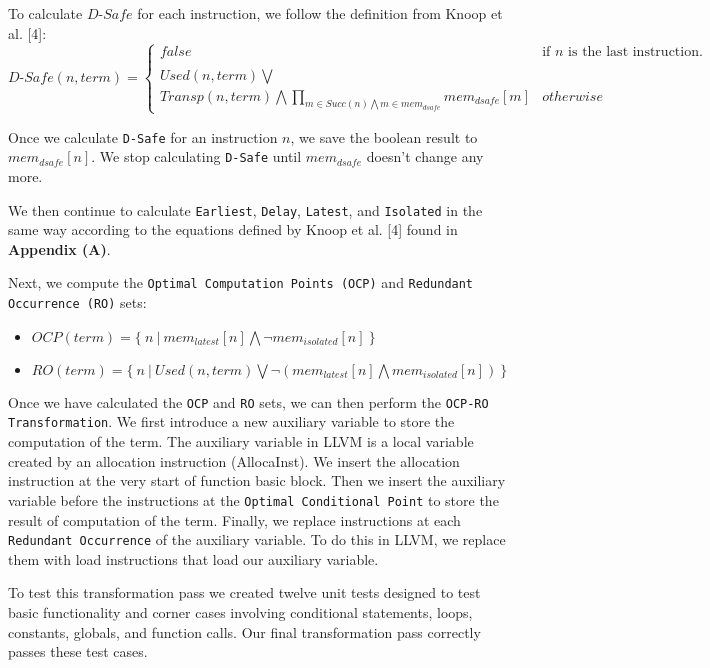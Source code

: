 \documentclass[onecolumn,10pt]{journal}
\begin{document}
To calculate $D\text{-}Safe$ for each instruction, we follow the definition from Knoop et al. [4]:
\newline
\newline
$
D\text{-}Safe(n, term) = 
\begin{cases}
false & \text{if } n\text{ is the last instruction.} \\
\\
Used(n, term) \bigvee \\
Transp(n, term) \bigwedge \prod\limits_{m \in Succ(n) \bigwedge m \in mem_{dsafe}}mem_{dsafe}[m] & otherwise
\end{cases}
$
\newline

Once we calculate \texttt{D-Safe} for an instruction $n$, we save the boolean result to $mem_{dsafe}[n]$. We stop calculating \texttt{D-Safe} until $mem_{dsafe}$ doesn't change any more.    

We then continue to calculate \texttt{Earliest}, \texttt{Delay}, \texttt{Latest}, and \texttt{Isolated} in the same way according to the equations defined by Knoop et al. [4] found in \textbf{Appendix (A)}.  

\pagebreak
Next, we compute the \texttt{Optimal Computation Points (OCP)} and \texttt{Redundant Occurrence (RO)} sets: 
\begin{itemize}
\item $OCP(term) = \{\ n\ |\ mem_{latest}[n] \bigwedge \neg mem_{isolated}[n] \ \}$
\item $RO(term) = \{\ n\ |\ Used(n, term) \bigvee \neg ( mem_{latest}[n] \bigwedge mem_{isolated}[n] ) \ \}$
\end{itemize}

Once we have calculated the \texttt{OCP} and \texttt{RO} sets, we can then perform the \texttt{OCP-RO Transformation}. We first introduce a new auxiliary variable to store the computation of the term. The auxiliary variable in LLVM is a local variable created by an allocation instruction (AllocaInst). We insert the allocation instruction at the very start of function basic block. Then we insert the auxiliary variable before the instructions at the \texttt{Optimal Conditional Point} to store the result of computation of the term. Finally, we replace instructions at each \texttt{Redundant Occurrence} of the auxiliary variable. To do this in LLVM, we replace them with load instructions that load our auxiliary variable.

To test this transformation pass we created twelve unit tests designed to test basic functionality and corner cases involving conditional statements, loops, constants, globals, and function calls. Our final transformation pass correctly passes these test cases.
\end{document}
